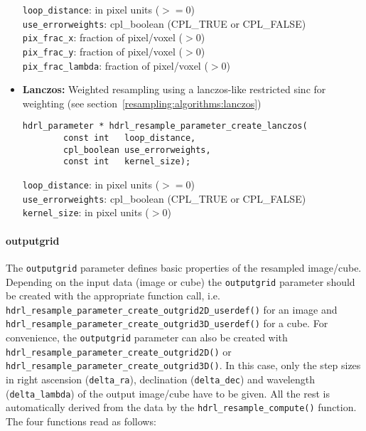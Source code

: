 \begin{itemize}
\begin{lstlisting}
\end{lstlisting}
      
\verb+loop_distance+: in pixel units ($>= 0$) \\ 
\verb+use_errorweights+: cpl\_boolean (CPL\_TRUE or CPL\_FALSE)\\  
\verb+pix_frac_x+: fraction of pixel/voxel ($> 0$) \\ 
\verb+pix_frac_y+: fraction of pixel/voxel ($> 0$) \\ 
\verb+pix_frac_lambda+: fraction of pixel/voxel ($> 0$) \\ 

\item {\bf Lanczos:} Weighted resampling using a lanczos-like restricted sinc
        for weighting (see section~\ref{resampling:algorithms:lanczos}) 
\begin{lstlisting}
hdrl_parameter * hdrl_resample_parameter_create_lanczos(
        const int   loop_distance,
        cpl_boolean use_errorweights,
        const int   kernel_size);
\end{lstlisting}

\verb+loop_distance+: in pixel units ($>= 0$) \\ 
\verb+use_errorweights+: cpl\_boolean (CPL\_TRUE or CPL\_FALSE)\\  
\verb+kernel_size+: in pixel units ($> 0$) 
\end{itemize}


\paragraph*{outputgrid}
The \verb+outputgrid+ parameter defines basic properties of the resampled
image/cube. Depending on the input data (image or cube) the \verb+outputgrid+
parameter should be created with the appropriate function call,
i.e. \\ \verb+hdrl_resample_parameter_create_outgrid2D_userdef()+ for an image
and \\ \verb+hdrl_resample_parameter_create_outgrid3D_userdef()+ for a
cube. For convenience, the \verb+outputgrid+ parameter can also be created with
\verb+hdrl_resample_parameter_create_outgrid2D()+ or
\verb+hdrl_resample_parameter_create_outgrid3D()+. In this case, only the step
sizes in right ascension (\verb+delta_ra+), declination (\verb+delta_dec+) and
wavelength (\verb+delta_lambda+) of the output image/cube have to be given. All
the rest is automatically derived from the data by the
\verb+hdrl_resample_compute()+ function. The four functions read as follows:

